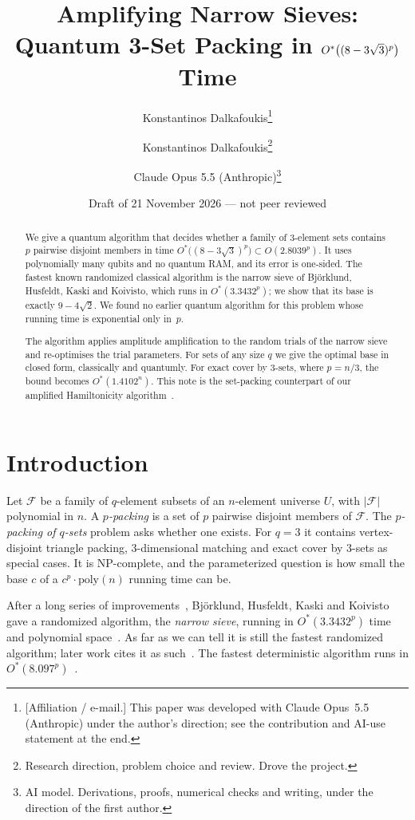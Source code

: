 \documentclass[11pt,a4paper]{article}
\title{Amplifying Narrow Sieves:\\[2pt]
Quantum 3-Set Packing in $\Ostar\big((8-3\sqrt3)^{p}\big)$ Time}
\author{Konstantinos Dalkafoukis\thanks{[Affiliation / e-mail.] This paper was developed with Claude Opus~5.5 (Anthropic) under the author's direction; see the contribution and AI-use statement at the end.}}
\author{
  Konstantinos Dalkafoukis\thanks{Research direction, problem choice and review. Drove the project.}
  \and
  Claude Opus 5.5 (Anthropic)\thanks{AI model. Derivations, proofs, numerical checks and writing, under the direction of the first author.}
}
\date{Draft of 21 November 2026 --- not peer reviewed}
\theoremstyle{plain}
\theoremstyle{remark}
\newcommand{\Ostar}{O^{*}}
\newcommand{\F}{\mathcal{F}}
\begin{document}
\maketitle

\begin{abstract}
\noindent
We give a quantum algorithm that decides whether a family of 3-element sets contains $p$ pairwise disjoint members in time $\Ostar\big((8-3\sqrt3)^{p}\big) \subset O(2.8039^{p})$. It uses polynomially many qubits and no quantum RAM, and its error is one-sided. The fastest known randomized classical algorithm is the narrow sieve of Björklund, Husfeldt, Kaski and Koivisto, which runs in $\Ostar(3.3432^p)$; we show that its base is exactly $9-4\sqrt2$. We found no earlier quantum algorithm for this problem whose running time is exponential only in~$p$.

The algorithm applies amplitude amplification to the random trials of the narrow sieve and re-optimises the trial parameters. For sets of any size $q$ we give the optimal base in closed form, classically and quantumly. For exact cover by 3-sets, where $p = n/3$, the bound becomes $\Ostar(1.4102^{n})$. This note is the set-packing counterpart of our amplified Hamiltonicity algorithm~\cite{hamilton}.
\end{abstract}

\section{Introduction}

Let $\F$ be a family of $q$-element subsets of an $n$-element universe $U$, with $|\F|$ polynomial in $n$. A \emph{$p$-packing} is a set of $p$ pairwise disjoint members of $\F$. The \emph{$p$-packing of $q$-sets} problem asks whether one exists. For $q = 3$ it contains vertex-disjoint triangle packing, 3-dimensional matching and exact cover by 3-sets as special cases. It is NP-complete, and the parameterized question is how small the base $c$ of a $c^p\cdot\mathrm{poly}(n)$ running time can be.

After a long series of improvements~\cite[Table~2]{bhkk}, Björklund, Husfeldt, Kaski and Koivisto gave a randomized algorithm, the \emph{narrow sieve}, running in $\Ostar(3.3432^p)$ time and polynomial space~\cite{bhkk}. As far as we can tell it is still the fastest randomized algorithm; later work cites it as such~\cite{zehavi15,zehavi23}. The fastest deterministic algorithm runs in $\Ostar(8.097^p)$~\cite{zehavi23}.
\end{document}
